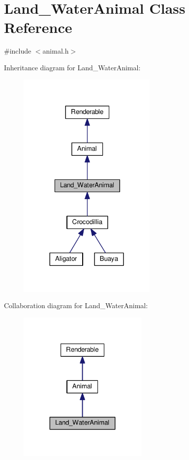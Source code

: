 \hypertarget{classLand__WaterAnimal}{}\section{Land\+\_\+\+Water\+Animal Class Reference}
\label{classLand__WaterAnimal}


{\ttfamily \#include $<$animal.\+h$>$}



Inheritance diagram for Land\+\_\+\+Water\+Animal\+:
\nopagebreak
\begin{figure}[H]
\begin{center}
\leavevmode
\includegraphics[width=192pt]{classLand__WaterAnimal__inherit__graph}
\end{center}
\end{figure}


Collaboration diagram for Land\+\_\+\+Water\+Animal\+:
\nopagebreak
\begin{figure}[H]
\begin{center}
\leavevmode
\includegraphics[width=179pt]{classLand__WaterAnimal__coll__graph}
\end{center}
\end{figure}
